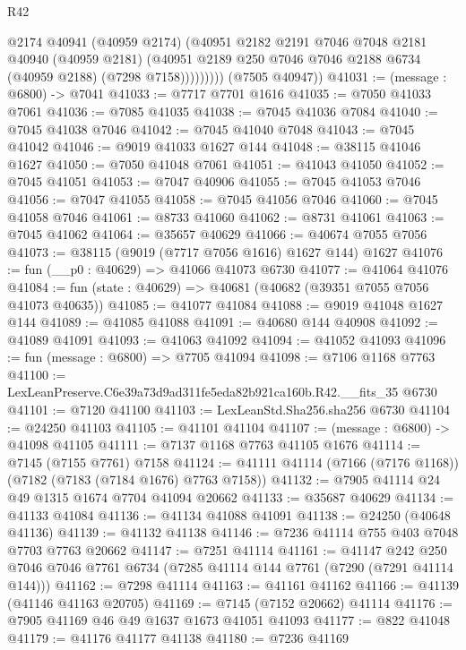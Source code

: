\begin{lexlean}{R42}
\begin{coremodule}
{                  @2174
                  @40941
                  (@40959 @2174)
                  (@40951
                    @2182
                    @2191
                    @7046
                    @7048
                    @2181
                    @40940
                    (@40959 @2181)
                    (@40951 @2189 @250 @7046 @7046 @2188 @6734 (@40959 @2188) (@7298 @7158)))))))))
      (@7505 @40947))
@41031 := (message : @6800) -> @7041
@41033 := @7717 @7701 @1616
@41035 := @7050 @41033 @7061
@41036 := @7085 @41035
@41038 := @7045 @41036 @7084
@41040 := @7045 @41038 @7046
@41042 := @7045 @41040 @7048
@41043 := @7045 @41042
@41046 := @9019 @41033 @1627 @144
@41048 := @38115 @41046 @1627
@41050 := @7050 @41048 @7061
@41051 := @41043 @41050
@41052 := @7045 @41051
@41053 := @7047 @40906
@41055 := @7045 @41053 @7046
@41056 := @7047 @41055
@41058 := @7045 @41056 @7046
@41060 := @7045 @41058 @7046
@41061 := @8733 @41060
@41062 := @8731 @41061
@41063 := @7045 @41062
@41064 := @35657 @40629
@41066 := @40674 @7055 @7056
@41073 := @38115 (@9019 (@7717 @7056 @1616) @1627 @144) @1627
@41076 := fun (__p0 : @40629) => @41066 @41073 @6730
@41077 := @41064 @41076
@41084 := fun (state : @40629) => @40681 (@40682 (@39351 @7055 @7056 @41073 @40635))
@41085 := @41077 @41084
@41088 := @9019 @41048 @1627 @144
@41089 := @41085 @41088
@41091 := @40680 @144 @40908
@41092 := @41089 @41091
@41093 := @41063 @41092
@41094 := @41052 @41093
@41096 := fun (message : @6800) => @7705 @41094
@41098 := @7106 @1168 @7763
@41100 := LexLeanPreserve.C6e39a73d9ad311fe5eda82b921ca160b.R42.__fits_35 @6730
@41101 := @7120 @41100
@41103 := LexLeanStd.Sha256.sha256 @6730
@41104 := @24250 @41103
@41105 := @41101 @41104
@41107 := (message : @6800) -> @41098 @41105
@41111 := @7137 @1168 @7763 @41105 @1676
@41114 := @7145 (@7155 @7761) @7158
@41124 := @41111 @41114 (@7166 (@7176 @1168)) (@7182 (@7183 (@7184 @1676) @7763 @7158))
@41132 := @7905 @41114 @24 @49 @1315 @1674 @7704 @41094 @20662
@41133 := @35687 @40629
@41134 := @41133 @41084
@41136 := @41134 @41088 @41091
@41138 := @24250 (@40648 @41136)
@41139 := @41132 @41138
@41146 := @7236 @41114 @755 @403 @7048 @7703 @7763 @20662
@41147 := @7251 @41114
@41161 := @41147
    @242
    @250
    @7046
    @7046
    @7761
    @6734
    (@7285 @41114 @144 @7761 (@7290 (@7291 @41114 @144)))
@41162 := @7298 @41114
@41163 := @41161 @41162
@41166 := @41139 (@41146 @41163 @20705)
@41169 := @7145 (@7152 @20662) @41114
@41176 := @7905 @41169 @46 @49 @1637 @1673 @41051 @41093
@41177 := @822 @41048
@41179 := @41176 @41177 @41138
@41180 := @7236 @41169
}
\end{coremodule}
\end{lexlean}
